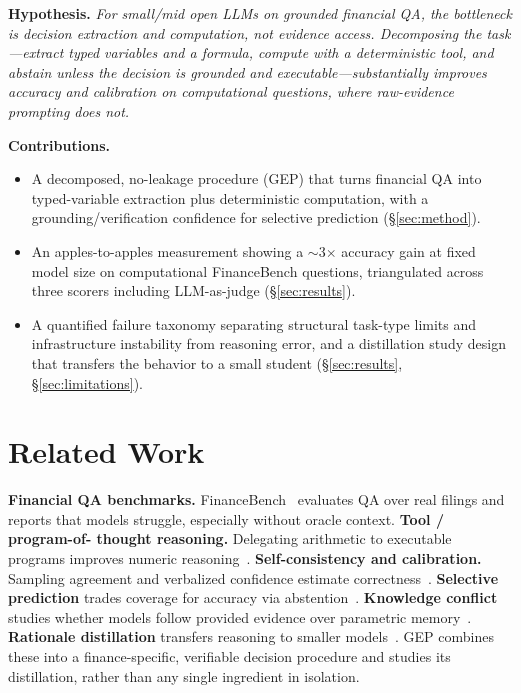 \documentclass[sigconf,nonacm]{acmart}
\begin{document}
\textbf{Hypothesis.} \emph{For small/mid open LLMs on grounded financial QA, the bottleneck is
decision extraction and computation, not evidence access. Decomposing the task---extract typed
variables and a formula, compute with a deterministic tool, and abstain unless the decision is
grounded and executable---substantially improves accuracy and calibration on computational
questions, where raw-evidence prompting does not.}

\textbf{Contributions.}
\begin{itemize}
\item A decomposed, no-leakage procedure (\textsc{GEP}) that turns financial QA into
typed-variable extraction plus deterministic computation, with a grounding/verification
confidence for selective prediction (\S\ref{sec:method}).
\item An apples-to-apples measurement showing a $\sim$3$\times$ accuracy gain at fixed model size
on computational FinanceBench questions, triangulated across three scorers including
LLM-as-judge (\S\ref{sec:results}).
\item A quantified failure taxonomy separating structural task-type limits and infrastructure
instability from reasoning error, and a distillation study design that transfers the behavior to
a small student (\S\ref{sec:results}, \S\ref{sec:limitations}).
\end{itemize}

\section{Related Work}
\textbf{Financial QA benchmarks.} FinanceBench~\cite{financebench} evaluates QA over real filings
and reports that models struggle, especially without oracle context. \textbf{Tool / program-of-
thought reasoning.} Delegating arithmetic to executable programs improves numeric
reasoning~\cite{pot}. \textbf{Self-consistency and calibration.} Sampling agreement and
verbalized confidence estimate correctness~\cite{selfconsistency,calibration}. \textbf{Selective
prediction} trades coverage for accuracy via abstention~\cite{selective}. \textbf{Knowledge
conflict} studies whether models follow provided evidence over parametric
memory~\cite{knowledgeconflict}. \textbf{Rationale distillation} transfers reasoning to smaller
models~\cite{distill}. \textsc{GEP} combines these into a finance-specific, verifiable
decision procedure and studies its distillation, rather than any single ingredient in isolation.
\end{document}
